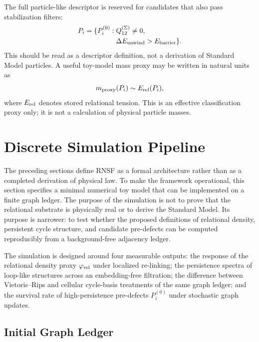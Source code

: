 \documentclass[11pt]{article}
\newcommand{\Pre}{P_i^{(0)}}
\newcommand{\Pfull}{P_i}
\newcommand{\Qlink}{Q_{12}^{(\Sigma)}}
\begin{document}
The full particle-like descriptor is reserved for candidates that also pass stabilization filters:
\begin{equation}
\begin{aligned}
    \Pfull = \{\Pre:\;&
    \Qlink\neq 0,\\
    &\Delta E_{\rm unwind}>E_{\rm barrier}\}.
\end{aligned}
\end{equation}
This should be read as a descriptor definition, not a derivation of Standard Model particles. A useful toy-model mass proxy may be written in natural units as
\begin{equation}
    m_{\rm proxy}(\Pfull)\sim E_{\rm rel}(\Pfull),
\end{equation}
where \(E_{\rm rel}\) denotes stored relational tension. This is an effective classification proxy only; it is not a calculation of physical particle masses.

\section{Discrete Simulation Pipeline}
\label{sec:discrete-simulation-pipeline}

The preceding sections define RNSF as a formal architecture rather than as a completed derivation of physical law. To make the framework operational, this section specifies a minimal numerical toy model that can be implemented on a finite graph ledger. The purpose of the simulation is not to prove that the relational substrate is physically real or to derive the Standard Model. Its purpose is narrower: to test whether the proposed definitions of relational density, persistent cycle structure, and candidate pre-defects can be computed reproducibly from a background-free adjacency ledger.

The simulation is designed around four measurable outputs: the response of the relational density proxy \(\varphi_{\rm rel}\) under localized re-linking; the persistence spectra of loop-like structures across an embedding-free filtration; the difference between Vietoris--Rips and cellular cycle-basis treatments of the same graph ledger; and the survival rate of high-persistence pre-defects \(\Pre\) under stochastic graph updates.

\subsection{Initial Graph Ledger}
\end{document}
